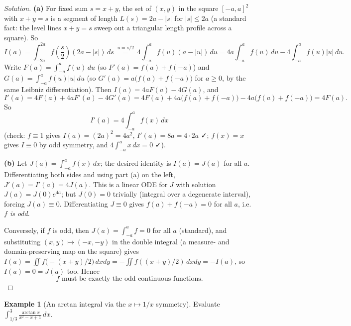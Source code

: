 \documentclass[11pt]{article}
\theoremstyle{definition}
\newtheorem{example}{Example}[section]
\begin{document}
\begin{proof}[Solution]
\textbf{(a)} For fixed sum $s=x+y$, the set of $(x,y)$ in the square $[-a,a]^2$ with $x+y=s$ is a segment of length $L(s)=2a-|s|$ for $|s|\le2a$ (a standard fact: the level lines $x+y=s$ sweep out a triangular length profile across a square). So
\[
I(a)=\int_{-2a}^{2a} f\!\left(\frac s2\right)(2a-|s|)\,ds \ \overset{u=s/2}{=}\ 4\int_{-a}^{a} f(u)(a-|u|)\,du = 4a\!\int_{-a}^a\! f(u)\,du - 4\!\int_{-a}^a\! f(u)|u|\,du.
\]
Write $F(a)=\int_{-a}^af(u)\,du$ (so $F'(a)=f(a)+f(-a)$) and $G(a)=\int_{-a}^af(u)|u|\,du$ (so $G'(a)=a\big(f(a)+f(-a)\big)$ for $a\ge0$, by the same Leibniz differentiation). Then $I(a)=4aF(a)-4G(a)$, and
\[
I'(a)=4F(a)+4aF'(a)-4G'(a)=4F(a)+4a\big(f(a)+f(-a)\big)-4a\big(f(a)+f(-a)\big)=4F(a).
\]
So
\[
\boxed{I'(a)=4\int_{-a}^a f(x)\,dx}
\]
(check: $f\equiv1$ gives $I(a)=(2a)^2=4a^2$, $I'(a)=8a=4\cdot2a$ ✓; $f(x)=x$ gives $I\equiv0$ by odd symmetry, and $4\int_{-a}^ax\,dx=0$ ✓).

\textbf{(b)} Let $J(a)=\int_{-a}^af(x)\,dx$; the desired identity is $I(a)=J(a)$ for all $a$. Differentiating both sides and using part (a) on the left, $J'(a)=I'(a)=4J(a)$. This is a linear ODE for $J$ with solution $J(a)=J(0)e^{4a}$; but $J(0)=0$ trivially (integral over a degenerate interval), forcing $J(a)\equiv0$. Differentiating $J\equiv0$ gives $f(a)+f(-a)=0$ for all $a$, i.e.\ \emph{$f$ is odd}.

Conversely, if $f$ is odd, then $J(a)=\int_{-a}^af=0$ for all $a$ (standard), and substituting $(x,y)\mapsto(-x,-y)$ in the double integral (a measure- and domain-preserving map on the square) gives $I(a)=\iint f\big({-}(x+y)/2\big)\,dxdy=-\iint f((x+y)/2)\,dxdy=-I(a)$, so $I(a)=0=J(a)$ too. Hence
\[
\boxed{f \text{ must be exactly the odd continuous functions}}.
\]
\end{proof}

\begin{example}[An arctan integral via the $x\mapsto1/x$ symmetry]
Evaluate $\displaystyle\int_{1/3}^3\frac{\arctan x}{x^2-x+1}\,dx$.
\end{example}
\end{document}
